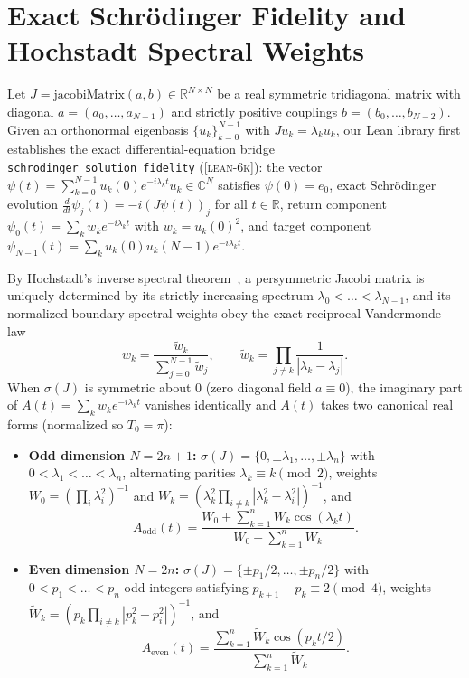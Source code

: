 \documentclass[11pt,reqno]{amsart}
\theoremstyle{definition}
\newcommand{\R}{\mathbb{R}}
\newcommand{\C}{\mathbb{C}}
\newcommand{\taglean}{\textsc{[lean-6k]}}
\newcommand{\id}[1]{\textnormal{\texttt{\small #1}}}
\begin{document}
\section{Exact Schr\"{o}dinger Fidelity and Hochstadt Spectral Weights}
\label{sec:prelim}

Let $J=\mathrm{jacobiMatrix}(a,b)\in\R^{N\times N}$ be a real symmetric tridiagonal matrix with diagonal $a=(a_0,\dots,a_{N-1})$ and strictly positive couplings $b=(b_0,\dots,b_{N-2})$. Given an orthonormal eigenbasis $\{u_k\}_{k=0}^{N-1}$ with $J u_k = \lambda_k u_k$, our Lean library first establishes the exact differential-equation bridge \id{schrodinger\_solution\_fidelity} (\taglean{}): the vector $\psi(t)=\sum_{k=0}^{N-1} u_k(0)e^{-i\lambda_k t} u_k \in \C^N$ satisfies $\psi(0)=e_0$, exact Schr\"{o}dinger evolution $\frac{d}{dt}\psi_j(t) = -i(J\psi(t))_j$ for all $t\in\R$, return component $\psi_0(t)=\sum_k w_k e^{-i\lambda_k t}$ with $w_k = u_k(0)^2$, and target component $\psi_{N-1}(t)=\sum_k u_k(0)u_k(N-1)e^{-i\lambda_k t}$.

By Hochstadt's inverse spectral theorem~\cite{hochstadt1967,hochstadt1974,deboor1978}, a persymmetric Jacobi matrix is uniquely determined by its strictly increasing spectrum $\lambda_0<\dots<\lambda_{N-1}$, and its normalized boundary spectral weights obey the exact reciprocal-Vandermonde law
\begin{equation}
\label{eq:hochstadt}
w_k = \frac{\widetilde{w}_k}{\sum_{j=0}^{N-1} \widetilde{w}_j}, \qquad \widetilde{w}_k = \prod_{j\neq k} \frac{1}{|\lambda_k - \lambda_j|}.
\end{equation}
When $\sigma(J)$ is symmetric about $0$ (zero diagonal field $a\equiv 0$), the imaginary part of $A(t)=\sum_k w_k e^{-i\lambda_k t}$ vanishes identically and $A(t)$ takes two canonical real forms (normalized so $T_0=\pi$):
\begin{itemize}
\item \textbf{Odd dimension $N=2n+1$:} $\sigma(J)=\{0,\pm\lambda_1,\dots,\pm\lambda_n\}$ with $0<\lambda_1<\dots<\lambda_n$, alternating parities $\lambda_k\equiv k\pmod{2}$, weights $W_0=(\prod_i\lambda_i^2)^{-1}$ and $W_k=(\lambda_k^2\prod_{i\neq k}|\lambda_k^2-\lambda_i^2|)^{-1}$, and
\begin{equation}
\label{eq:amp-odd}
A_{\mathrm{odd}}(t) = \frac{W_0 + \sum_{k=1}^n W_k \cos(\lambda_k t)}{W_0 + \sum_{k=1}^n W_k}.
\end{equation}
\item \textbf{Even dimension $N=2n$:} $\sigma(J)=\{\pm p_1/2,\dots,\pm p_n/2\}$ with $0<p_1<\dots<p_n$ odd integers satisfying $p_{k+1}-p_k\equiv 2\pmod{4}$, weights $\widetilde{W}_k=(p_k\prod_{i\neq k}|p_k^2-p_i^2|)^{-1}$, and
\begin{equation}
\label{eq:amp-even}
A_{\mathrm{even}}(t) = \frac{\sum_{k=1}^n \widetilde{W}_k \cos(p_k t/2)}{\sum_{k=1}^n \widetilde{W}_k}.
\end{equation}
\end{itemize}
\end{document}
